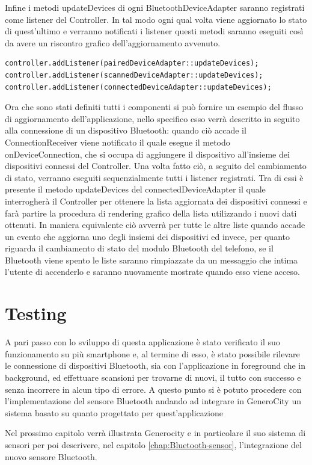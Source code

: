 Infine i metodi updateDevices di ogni BluetoothDeviceAdapter saranno registrati come listener del Controller. In tal modo ogni qual volta viene aggiornato lo stato di quest'ultimo e verranno notificati i listener questi metodi saranno eseguiti così da avere un riscontro grafico dell'aggiornamento avvenuto.
\begin{verbatim}
controller.addListener(pairedDeviceAdapter::updateDevices);
controller.addListener(scannedDeviceAdapter::updateDevices);
controller.addListener(connectedDeviceAdapter::updateDevices);
\end{verbatim}

Ora che sono stati definiti tutti i componenti si può fornire un esempio del flusso di aggiornamento dell'applicazione, nello specifico esso verrà descritto in seguito alla connessione di un dispositivo Bluetooth: quando ciò accade il ConnectionReceiver viene notificato il quale esegue il metodo onDeviceConnection, che si occupa di aggiungere il dispositivo all'insieme dei dispositivi connessi del Controller. Una volta fatto ciò, a seguito del cambiamento di stato, verranno eseguiti sequenzialmente tutti i listener registrati. Tra di essi è presente il metodo updateDevices del connectedDeviceAdapter il quale interrogherà il Controller per ottenere la lista aggiornata dei dispositivi connessi e farà partire la procedura di rendering grafico della lista utilizzando i nuovi dati ottenuti. In maniera equivalente ciò avverrà per tutte le altre liste quando accade un evento che aggiorna uno degli insiemi dei dispositivi ed invece, per quanto riguarda il cambiamento di stato del modulo Bluetooth del telefono, se il Bluetooth viene spento le liste saranno rimpiazzate da un messaggio che intima l'utente di accenderlo e saranno nuovamente mostrate quando esso viene acceso. 

\section{Testing}
A pari passo con lo sviluppo di questa applicazione è stato verificato il suo funzionamento su più smartphone e, al termine di esso, è stato possibile rilevare le connessione di dispositivi Bluetooth, sia con l'applicazione in foreground che in background, ed effettuare scansioni per trovarne di nuovi, il tutto con successo e senza incorrere in alcun tipo di errore. A questo punto si è potuto procedere con l'implementazione del sensore Bluetooth andando ad integrare in GeneroCity un sistema basato su quanto progettato per quest'applicazione

Nel prossimo capitolo verrà illustrata Generocity e in particolare il suo sistema di sensori per poi descrivere, nel capitolo \ref{chap:Bluetooth-sensor}, l'integrazione del nuovo sensore Bluetooth.